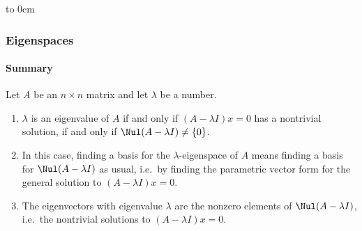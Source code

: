\begin{frame}
\quad
\hbox to 0cm{
\begin{minipage}[c]{.5\linewidth}

  \medskip
  \begin{overlayarea}{\linewidth}{3cm}
  \end{overlayarea}
\end{minipage}\hss}

\end{frame}



\begin{frame}
\frametitle{Eigenspaces}
\framesubtitle{Summary}

\vfill

\begin{bluebox}{.8\linewidth}
  Let $A$ be an $n\times n$ matrix and let $\lambda$ be a number.
  \pause\smallskip
  \begin{enumerate}
  \item $\lambda$ is an eigenvalue of $A$ if and only if
    $(A-\lambda I)x = 0$ has a nontrivial solution, if and only if
    $\Nul(A-\lambda I)\neq\{0\}$.
    \pause
  \item In this case, finding a basis for the $\lambda$-eigenspace of $A$
    means finding a basis for $\Nul(A-\lambda I)$ as usual, i.e.\ by finding the
    parametric vector form for the general solution to
    $(A-\lambda I)x = 0$.
    \pause
  \item The eigenvectors with eigenvalue $\lambda$ are the nonzero elements of
    $\Nul(A-\lambda I)$, i.e.\ the nontrivial solutions to $(A-\lambda I)x = 0$.
  \end{enumerate}
  
\end{bluebox}

\vfill

\end{frame}


